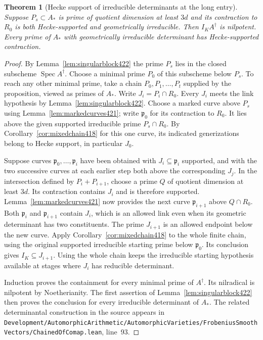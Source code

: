 \documentclass[a4paper,11pt]{article}
\newtheorem{theorem}[proposition]{Theorem}
\theoremstyle{definition}
\theoremstyle{remark}
\newcommand{\srcloc}[2]{{\small\nolinkurl{#1.lean}}, line~#2}
\numberwithin{equation}{section}
\begin{document}
\begin{theorem}[Hecke support of irreducible determinants at the long entry]\leavevmode
\label{thm:longrootchart422}
Suppose \(P_s\subset A_*\) is prime of quotient dimension
at least \(3d\) and its contraction to \(R_0\) is both
Hecke-supported and geometrically irreducible. Then
\(I_K A^\dagger\) is nilpotent. Every prime of \(A_*\)
with geometrically irreducible determinant has Hecke-supported
contraction.
\end{theorem}
\begin{proof}
By Lemma~\ref{lem:singularblock422} the prime \(P_s\) lies
in the closed subscheme \(\operatorname{Spec} A^\dagger\).
Choose a minimal prime \(P_0\) of this subscheme below \(P_s\).
To reach any other minimal prime, take a chain
\(P_0,P_1,\ldots,P_t\) supplied by the proposition, viewed
as primes of \(A_*\). Write \(J_i=P_i\cap R_0\). Every \(J_i\)
meets the link hypothesis by Lemma~\ref{lem:singularblock422}.
Choose a marked curve above \(P_s\) using
Lemma~\ref{lem:markedcurves421}; write \(\mathfrak p_0\)
for its contraction to \(R_0\). It lies above the given
supported irreducible prime \(P_s\cap R_0\). By
Corollary~\ref{cor:mixedchain418} for this one curve,
its indicated generizations belong to Hecke support, in
particular \(J_0\).

Suppose curves \(\mathfrak p_0,\ldots,\mathfrak p_i\) have
been obtained with \(J_i\subseteq\mathfrak p_i\) supported,
and with the two successive curves at each earlier step
both above the corresponding \(J_j\). In the intersection
defined by \(P_i+P_{i+1}\), choose a prime \(Q\) of quotient
dimension at least \(3d\). Its contraction contains \(J_i\)
and is therefore supported. Lemma~\ref{lem:markedcurves421}
now provides the next curve \(\mathfrak p_{i+1}\) above
\(Q\cap R_0\). Both \(\mathfrak p_i\) and
\(\mathfrak p_{i+1}\) contain \(J_i\), which is an allowed
link even when its geometric determinant has two constituents.
The prime \(J_{i+1}\) is an allowed endpoint below the new
curve. Apply Corollary~\ref{cor:mixedchain418} to the whole
finite chain, using the original supported irreducible
starting prime below \(\mathfrak p_0\). Its conclusion
gives \(I_K\subseteq J_{i+1}\). Using the whole chain keeps
the irreducible starting hypothesis available at stages where
\(J_i\) has reducible determinant.

Induction proves the containment for every minimal prime of
\(A^\dagger\). Its nilradical is nilpotent by Noetherianity.
The first assertion of Lemma~\ref{lem:singularblock422} then
proves the conclusion for every irreducible determinant of
\(A_*\). The related determinantal construction in the source
appears in \srcloc{Development/AutomorphicArithmetic/AutomorphicVarieties/FrobeniusSmoothVectors/ChainedOfComap}{93}.
\end{proof}
\end{document}

